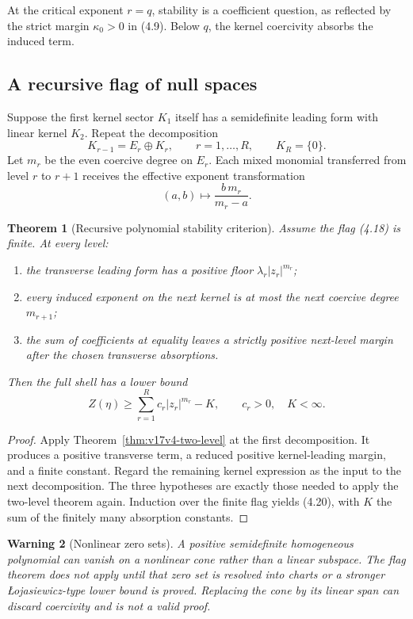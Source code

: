 \documentclass[11pt]{article}
\newtheorem{theorem}{Theorem}[section]
\newtheorem{warning}[theorem]{Warning}
\theoremstyle{remark}
\begin{document}
At the critical exponent \(r=q\), stability is a coefficient
question, as reflected by the strict margin \(\kappa_0>0\) in
(4.9).  Below \(q\), the kernel coercivity absorbs the induced term.

\subsection{A recursive flag of null spaces}

Suppose the first kernel sector \(K_1\) itself has a semidefinite
leading form with linear kernel \(K_2\).  Repeat the decomposition
\[
 K_{r-1}=E_r\oplus K_r,\qquad
 r=1,\ldots,R,\qquad K_R=\{0\}.                    \tag{4.18}
\]
Let \(m_r\) be the even coercive degree on \(E_r\).  Each mixed
monomial transferred from level \(r\) to \(r+1\) receives the
effective exponent transformation
\[
 (a,b)\longmapsto
 \frac{b\,m_r}{m_r-a}.                              \tag{4.19}
\]

\begin{theorem}[Recursive polynomial stability criterion]
\label{thm:v17v4-recursive}
Assume the flag (4.18) is finite.  At every level:
\begin{enumerate}
\item the transverse leading form has a positive floor
      \(\lambda_r|z_r|^{m_r}\);
\item every induced exponent on the next kernel is at most the next
      coercive degree \(m_{r+1}\);
\item the sum of coefficients at equality leaves a strictly positive
      next-level margin after the chosen transverse absorptions.
\end{enumerate}
Then the full shell has a lower bound
\[
 Z(\eta)\geq
 \sum_{r=1}^R c_r|z_r|^{m_r}-K,
 \qquad c_r>0,\quad K<\infty.                       \tag{4.20}
\]
\end{theorem}

\begin{proof}
Apply Theorem~\ref{thm:v17v4-two-level} at the first decomposition.
It produces a positive transverse term, a reduced positive
kernel-leading margin, and a finite constant.  Regard the remaining
kernel expression as the input to the next decomposition.  The three
hypotheses are exactly those needed to apply the two-level theorem
again.  Induction over the finite flag yields (4.20), with \(K\) the
sum of the finitely many absorption constants.
\end{proof}

\begin{warning}[Nonlinear zero sets]
\label{warn:v17v4-nonlinear}
A positive semidefinite homogeneous polynomial can vanish on a
nonlinear cone rather than a linear subspace.  The flag theorem does
not apply until that zero set is resolved into charts or a stronger
Łojasiewicz-type lower bound is proved.  Replacing the cone by its
linear span can discard coercivity and is not a valid proof.
\end{warning}
\end{document}
